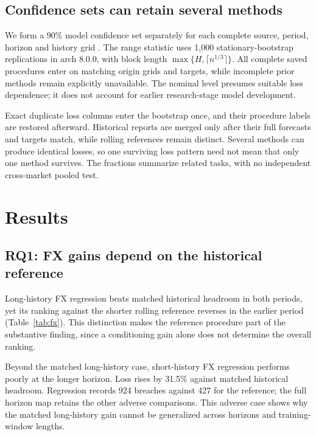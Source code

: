 \documentclass{rQUF2e}
\begin{document}
\subsection{Confidence sets can retain several methods}

We form a 90\% model confidence set separately for each complete source, period, horizon and history grid \citep{mcs2011}. The range statistic uses 1,000 stationary-bootstrap replications in arch 8.0.0, with block length $\max\{H,\lceil n^{1/3}\rceil\}$. All complete saved procedures enter on matching origin grids and targets, while incomplete prior methods remain explicitly unavailable. The nominal level presumes suitable loss dependence; it does not account for earlier research-stage model development.

Exact duplicate loss columns enter the bootstrap once, and their procedure labels are restored afterward. Historical reports are merged only after their full forecasts and targets match, while rolling references remain distinct. Several methods can produce identical losses, so one surviving loss pattern need not mean that only one method survives. The fractions summarize related tasks, with no independent cross-market pooled test.

\FloatBarrier

\section{Results}\label{sec:results}

\subsection{RQ1: FX gains depend on the historical reference}\label{sec:rq1}

Long-history FX regression beats matched historical headroom in both periods, yet its ranking against the shorter rolling reference reverses in the earlier period (Table~\ref{tab:fx}). This distinction makes the reference procedure part of the substantive finding, since a conditioning gain alone does not determine the overall ranking.

Beyond the matched long-history case, short-history FX regression performs poorly at the longer horizon. Loss rises by 31.5\% against matched historical headroom. Regression records 924 breaches against 427 for the reference; the full horizon map retains the other adverse comparisons. This adverse case shows why the matched long-history gain cannot be generalized across horizons and training-window lengths.
\end{document}
